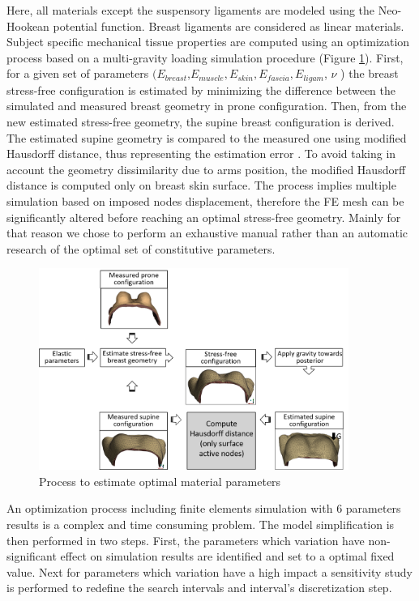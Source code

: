  Here, all materials except the suspensory ligaments are modeled using the Neo-Hookean potential function. Breast ligaments are considered as linear materials.  Subject specific mechanical tissue properties are computed using an optimization process based on a multi-gravity loading simulation procedure (Figure \ref{fig:optimizationalgo}). First, for a given set of parameters $(E_{breast}$,$ E_{muscle}, E_{skin}, E_{fascia}, E_{ligam}$, $\nu$ ) the breast stress-free configuration is estimated by minimizing the difference between the simulated and measured breast geometry in prone configuration. Then, from the new estimated stress-free geometry, the supine breast configuration is derived. The estimated supine geometry is compared to the measured one using modified Hausdorff distance, thus representing the estimation error .  To avoid taking in account the geometry dissimilarity due to arms position, the modified Hausdorff distance is computed only on breast skin surface.  
The process implies multiple simulation based on imposed nodes displacement, therefore the FE mesh can be significantly altered before reaching an optimal stress-free geometry. Mainly for that reason we chose to perform an exhaustive manual rather than an automatic research of the optimal set of constitutive parameters. 


\begin{figure}[!h]
\centering
\includegraphics[width=0.9\textwidth,keepaspectratio]{figures/optimizationMaterialParameters.png} 
\caption{Process to estimate optimal material parameters}\label{fig:optimizationalgo}
\end{figure}
 
 An optimization process including finite elements simulation with 6 parameters results is a complex and time consuming problem. The model simplification is then performed in two steps. First, the parameters which variation have non-significant effect on simulation results are identified and set to a optimal fixed value. Next for parameters which variation have a high impact a sensitivity study is performed to redefine the search intervals and interval's discretization step.
 
